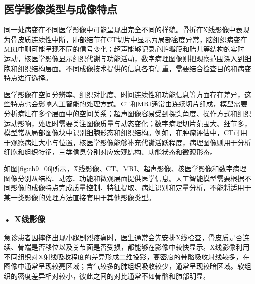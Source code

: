 \par
\noindent\begin{minipage}{\textwidth}
\centering
{}
\label{fig:ch9_05}
\end{minipage}
\par

\subsection{医学影像类型与成像特点}


同一处病变在不同医学影像中可能呈现出完全不同的样貌。骨折在X线影像中表现为骨皮质连续性中断，肺部结节在CT切片中显示为局部密度异常，脑组织病变在MRI中则可能呈现不同的信号变化；超声能够记录心脏瓣膜和胎儿等结构的实时运动，核医学影像显示组织代谢与功能活动，数字病理图像则把观察范围深入到细胞和组织结构层面。不同成像技术提供的信息各有侧重，需要结合检查目的和病变特点进行选择。

医学影像在空间分辨率、组织对比度、时间连续性和功能信息等方面存在差异，这些特点也会影响人工智能的处理方式。CT和MRI通常由连续切片组成，模型需要分析病灶在多个层面中的空间关系；超声图像容易受到探头角度、操作方式和组织运动影响，处理时需要关注图像质量与动态变化；数字病理切片范围大、细节多，模型常从局部图像块中识别细胞形态和组织结构。例如，在肿瘤评估中，CT可用于观察病灶大小与位置，核医学影像能够补充代谢活跃程度，病理图像则用于分析细胞和组织特征，三类信息分别对应宏观结构、功能状态和微观形态。

如图\ref{fig:ch9_06}所示，X线影像、CT、MRI、超声影像、核医学影像和数字病理图像分别从结构、动态、功能和微观层面提供医学信息。人工智能模型需要根据不同影像的成像特点完成质量控制、特征提取、病灶识别和定量分析，不能将适用于某一类影像的处理方法直接套用于其他影像类型。


\par
\noindent\begin{minipage}{\textwidth}
\centering
{}
\label{fig:ch9_06}
\end{minipage}
\par

\subsubsection*{\textbf{• X线影像}}

急诊患者因摔伤出现小腿剧烈疼痛时，医生通常会先安排X线检查，骨皮质是否连续、骨端是否移位以及关节面是否受损，都能够在影像中较快显示。X线影像利用不同组织对X射线吸收程度的差异形成二维投影，高密度的骨骼吸收射线较多，在图像中通常呈现较亮区域；含气较多的肺组织吸收较少，通常呈现较暗区域。软组织的密度差异相对较小，彼此之间的对比通常不如骨骼和肺部明显。

